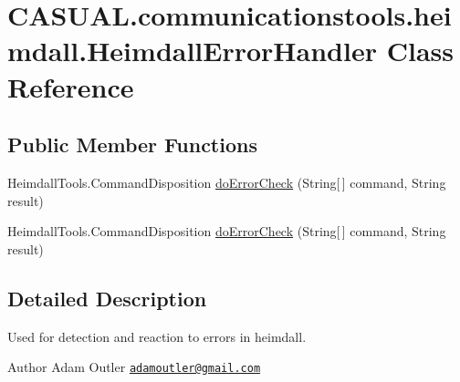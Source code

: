 \hypertarget{class_c_a_s_u_a_l_1_1communicationstools_1_1heimdall_1_1_heimdall_error_handler}{\section{C\-A\-S\-U\-A\-L.\-communicationstools.\-heimdall.\-Heimdall\-Error\-Handler Class Reference}
\label{class_c_a_s_u_a_l_1_1communicationstools_1_1heimdall_1_1_heimdall_error_handler}
}
\subsection*{Public Member Functions}
\begin{DoxyCompactItemize}
\item 
Heimdall\-Tools.\-Command\-Disposition \hyperlink{class_c_a_s_u_a_l_1_1communicationstools_1_1heimdall_1_1_heimdall_error_handler_a5369b44c5092c43d62d70c653006eb35}{do\-Error\-Check} (String\mbox{[}$\,$\mbox{]} command, String result)
\item 
Heimdall\-Tools.\-Command\-Disposition \hyperlink{class_c_a_s_u_a_l_1_1communicationstools_1_1heimdall_1_1_heimdall_error_handler_a5369b44c5092c43d62d70c653006eb35}{do\-Error\-Check} (String\mbox{[}$\,$\mbox{]} command, String result)
\end{DoxyCompactItemize}


\subsection{Detailed Description}
Used for detection and reaction to errors in heimdall. \begin{DoxyAuthor}{Author}
Adam Outler \href{mailto:adamoutler@gmail.com}{\tt adamoutler@gmail.\-com} 
\end{DoxyAuthor}


